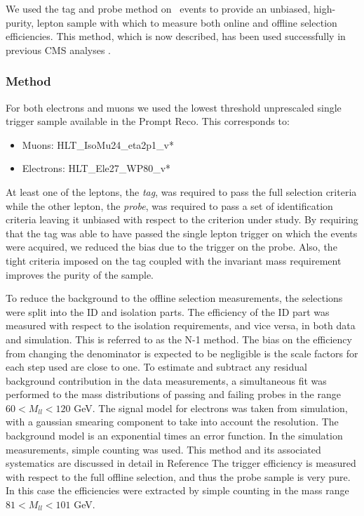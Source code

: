  
We used the tag and probe method on \dyll~events to provide an unbiased, high-purity, 
lepton sample with which to measure both online and offline selection efficiencies.
This method, which is now described, 
has been used successfully in previous CMS analyses \cite{ref:tagprobe_mit_w}\cite{ref:tagprobe_snt_top}.

\subsubsection{Method}
For both electrons and muons we used the lowest threshold unprescaled single trigger sample
available in the Prompt Reco.  This corresponds to:

\begin{itemize}
    \item Muons: HLT\_IsoMu24\_eta2p1\_v*
    \item Electrons: HLT\_Ele27\_WP80\_v*
\end{itemize}

At least one of the leptons, the {\it tag}, was required to pass the full selection criteria
while the other lepton, the {\it probe}, was required to pass a set of identification criteria leaving 
it unbiased with respect to the criterion under study. By requiring that the tag was able to have passed 
the single lepton trigger on which the events were acquired, we reduced the bias due to the trigger on 
the probe. Also, the tight criteria imposed on the tag coupled with the invariant mass requirement 
improves the purity of the sample. 

To reduce the background to the offline selection measurements,
the selections were split into the ID and isolation parts.  
The efficiency of the ID part was measured with respect to the isolation
requirements, and vice versa, in both data and simulation.
This is referred to as the N-1 method.
The bias on the efficiency from changing the denominator is
expected to be negligible is the scale factors for each step used
are close to one.
To estimate and subtract any residual background contribution in the data measurements,
a simultaneous fit was performed to the mass distributions
of passing and failing probes in the range $60<M_{ll}<120$ GeV.
The signal model for electrons was taken from simulation, 
with a gaussian smearing component to take into account the resolution.
The background model is an exponential times an error function.
In the simulation measurements, simple counting was used.
This method and its associated systematics are discussed in detail in Reference \cite{ref:tagprobe_mit_w}
The trigger efficiency is measured with respect to the full offline selection,
and thus the probe sample is very pure.  In this case the efficiencies were
extracted by simple counting in the mass range $81<M_{ll}<101$ GeV.


